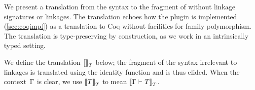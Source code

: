 We present a translation from the \TT syntax to the fragment of \TT without
linkage signatures or linkages.
The translation echoes how the \Lang plugin is implemented (\cref{sec:coqimpl})
as a translation to Coq without facilities for family polymorphism.
The translation is type-preserving by construction, as we work in an
intrinsically typed setting.

%
 


We define the translation ${{\llbracket {} \rrbracket}_T}$ below; the fragment of the syntax
irrelevant to linkages is translated using the identity function and is thus elided.
When the context~$\Gamma$ is clear, we use ${{\llbracket {T} \rrbracket}_T}$ to mean ${{\llbracket {\ensuremath{ {\Gamma} \vdash_{} {T} }} \rrbracket}_T}$.

